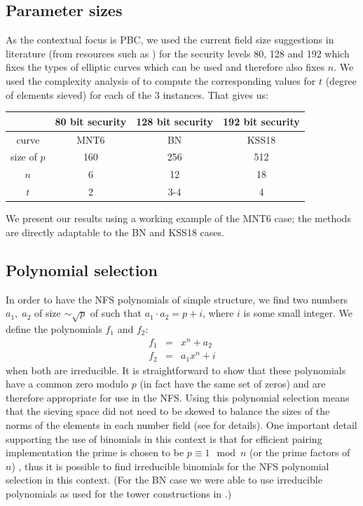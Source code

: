 \documentclass[a4paper, 12pt, envcountsect, runningheads]{llncs}
\numberwithin{figure}{section}
\numberwithin{equation}{section}
\begin{document}
\subsection*{Parameter sizes}
As the contextual focus is PBC, we used the current field size suggestions in literature (from resources such as \cite{lenstra-verheul,lenstra01,ECRYPT_key_sizes}) for the security levels 80, 128 and 192 which fixes the types of elliptic curves which can be used and therefore also fixes $n$. We used the complexity analysis of \cite{joux-lercier-smart-vercauteren06} to compute the corresponding values for $t$ (degree of elements sieved) for each of the 3 instances. That gives us:
\begin{center}
\begin{tabular}{|c|c|c|c|}
\hline
&80 bit security & 128 bit security & 192 bit security\\
\hline
curve & MNT6 & BN & KSS18\\
size of $p$ & 160 & 256 & 512\\
$n$ & 6 & 12 & 18\\
$t$ & 2 & 3-4 & 4\\
\hline
\end{tabular}
\end{center}
We present our results using a working example of the MNT6 case; the methods are directly adaptable to the BN and KSS18 cases. 
\subsection{Polynomial selection}
\label{ss:poly_selection}
In order to have the NFS polynomials of simple structure, we find two numbers $a_1,\;a_2$ of size $\sim\sqrt{p}$ of such that $a_1\cdot a_2=p+i$, where $i$ is some small integer. We define the polynomials $f_1$ and $f_2$:
\begin{eqnarray*}
f_1 &=& x^n + a_2\\
f_2 &=& a_1 x^n + i
\end{eqnarray*}
when both are irreducible. It is straightforward to show that these polynomials have a common zero modulo $p$ (in fact have the same set of zeros) and are therefore appropriate for use in the NFS. Using this polynomial selection means that the sieving space did not need to be skewed to balance the sizes of the norms of the elements in each number field (see \cite{joux-lercier-smart-vercauteren06} for details). One important detail supporting the use of binomials in this context is that for efficient pairing implementation the prime is chosen to be $p\equiv1\mod n$ (or the prime factors of $n$) \cite{koblitz-menezes05}, thus it is possible to find irreducible binomials for the NFS polynomial selection in this context. (For the BN case we were able to use irreducible polynomials as used for the tower constructions in \cite{towers}.) %
\end{document}
